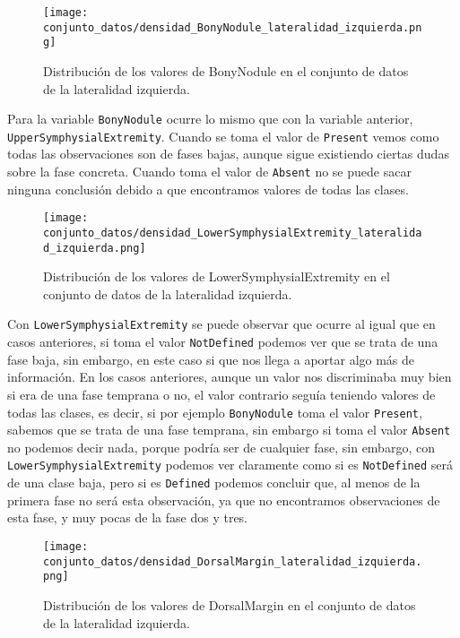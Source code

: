 \begin{figure}[H]
	\centering
	\texttt{[image: conjunto\_datos/densidad\_BonyNodule\_lateralidad\_izquierda.png]}
	\caption{Distribución de los valores de BonyNodule en el conjunto de datos de la lateralidad izquierda.}
	\label{fig:densidad_BonyNodule_lateralidad_izquierda}
\end{figure}

Para la variable \texttt{BonyNodule} ocurre lo mismo que con la variable anterior, \texttt{UpperSymphysialExtremity}. Cuando se toma el valor de \texttt{Present} vemos como todas las observaciones son de fases bajas, aunque sigue existiendo ciertas dudas sobre la fase concreta. Cuando toma el valor de \texttt{Absent} no se puede sacar ninguna conclusión debido a que encontramos valores de todas las clases.

\begin{figure}[H]
	\centering
	\texttt{[image: conjunto\_datos/densidad\_LowerSymphysialExtremity\_lateralidad\_izquierda.png]}
	\caption{Distribución de los valores de LowerSymphysialExtremity en el conjunto de datos de la lateralidad izquierda.}
	\label{fig:densidad_LowerSymphysialExtremity_lateralidad_izquierda}
\end{figure}

Con \texttt{LowerSymphysialExtremity} se puede observar que ocurre al igual que en casos anteriores, si toma el valor \texttt{NotDefined} podemos ver que se trata de una fase baja, sin embargo, en este caso si que nos llega a aportar algo más de información. En los casos anteriores, aunque un valor nos discriminaba muy bien si era de una fase temprana o no, el valor contrario seguía teniendo valores de todas las clases, es decir, si por ejemplo \texttt{BonyNodule} toma el valor \texttt{Present}, sabemos que se trata de una fase temprana, sin embargo si toma el valor \texttt{Absent} no podemos decir nada, porque podría ser de cualquier fase, sin embargo, con \texttt{LowerSymphysialExtremity} podemos ver claramente como si es \texttt{NotDefined} será de una clase baja, pero si es \texttt{Defined} podemos concluir que, al menos de la primera fase no será esta observación, ya que no encontramos observaciones de esta fase, y muy pocas de la fase dos y tres.

\begin{figure}[H]
	\centering
	\texttt{[image: conjunto\_datos/densidad\_DorsalMargin\_lateralidad\_izquierda.png]}
	\caption{Distribución de los valores de DorsalMargin en el conjunto de datos de la lateralidad izquierda.}
	\label{fig:densidad_DorsalMargin_izquierda}
\end{figure}

